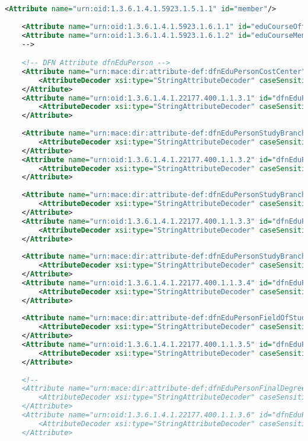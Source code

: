 \begin{lstlisting}[language=xml]
    <Attribute name="urn:oid:1.3.6.1.4.1.5923.1.5.1.1" id="member"/>
    
    <Attribute name="urn:oid:1.3.6.1.4.1.5923.1.6.1.1" id="eduCourseOffering"/>
    <Attribute name="urn:oid:1.3.6.1.4.1.5923.1.6.1.2" id="eduCourseMember"/>
    -->

    <!-- DFN Attribute dfnEduPerson -->
    <Attribute name="urn:mace:dir:attribute-def:dfnEduPersonCostCenter" id="dfnEduPersonCostCenter">
        <AttributeDecoder xsi:type="StringAttributeDecoder" caseSensitive="false"/>
    </Attribute>
    <Attribute name="urn:oid:1.3.6.1.4.1.22177.400.1.1.3.1" id="dfnEduPersonCostCenter">
        <AttributeDecoder xsi:type="StringAttributeDecoder" caseSensitive="false"/>
    </Attribute>
    
    <Attribute name="urn:mace:dir:attribute-def:dfnEduPersonStudyBranch1" id="dfnEduPersonStudyBranch1">
        <AttributeDecoder xsi:type="StringAttributeDecoder" caseSensitive="false"/>
    </Attribute>
    <Attribute name="urn:oid:1.3.6.1.4.1.22177.400.1.1.3.2" id="dfnEduPersonStudyBranch1">
        <AttributeDecoder xsi:type="StringAttributeDecoder" caseSensitive="false"/>
    </Attribute>
    
    <Attribute name="urn:mace:dir:attribute-def:dfnEduPersonStudyBranch2" id="dfnEduPersonStudyBranch2">
        <AttributeDecoder xsi:type="StringAttributeDecoder" caseSensitive="false"/>
    </Attribute>
    <Attribute name="urn:oid:1.3.6.1.4.1.22177.400.1.1.3.3" id="dfnEduPersonStudyBranch2">
        <AttributeDecoder xsi:type="StringAttributeDecoder" caseSensitive="false"/>
    </Attribute>
    
    <Attribute name="urn:mace:dir:attribute-def:dfnEduPersonStudyBranch3" id="dfnEduPersonStudyBranch3">
        <AttributeDecoder xsi:type="StringAttributeDecoder" caseSensitive="false"/>
    </Attribute>
    <Attribute name="urn:oid:1.3.6.1.4.1.22177.400.1.1.3.4" id="dfnEduPersonStudyBranch3">
        <AttributeDecoder xsi:type="StringAttributeDecoder" caseSensitive="false"/>
    </Attribute>
    
    <Attribute name="urn:mace:dir:attribute-def:dfnEduPersonFieldOfStudyString" id="dfnEduPersonFieldOfStudyString">
        <AttributeDecoder xsi:type="StringAttributeDecoder" caseSensitive="false"/>
    </Attribute>
    <Attribute name="urn:oid:1.3.6.1.4.1.22177.400.1.1.3.5" id="dfnEduPersonFieldOfStudyString">
        <AttributeDecoder xsi:type="StringAttributeDecoder" caseSensitive="false"/>
    </Attribute>
    
    <!--
    <Attribute name="urn:mace:dir:attribute-def:dfnEduPersonFinalDegree" id="dfnEduPersonFinalDegree">
        <AttributeDecoder xsi:type="StringAttributeDecoder" caseSensitive="false"/>
    </Attribute>
    <Attribute name="urn:oid:1.3.6.1.4.1.22177.400.1.1.3.6" id="dfnEduPersonFinalDegree">
        <AttributeDecoder xsi:type="StringAttributeDecoder" caseSensitive="false"/>
    </Attribute>


\end{lstlisting}
